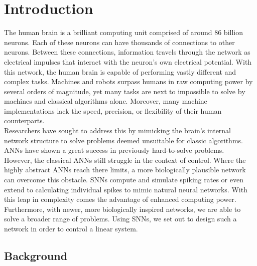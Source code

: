 \chapter{Introduction}

The human brain is a brilliant computing unit comprised of around 86 billion neurons\cite{azevedo_equal_2009}. Each of these neurons can have thousands of connections to other neurons. Between these connections, information travels through the network as electrical impulses that interact with the neuron's own electrical potential. With this network, the human brain is capable of performing vastly different and complex tasks. Machines and robots surpass humans in raw computing power by several orders of magnitude, yet many tasks are next to impossible to solve by machines and classical algorithms alone. Moreover, many machine implementations lack the speed, precision, or flexibility of their human counterparts.\\
Researchers have sought to address this by mimicking the brain's internal network structure to solve problems deemed unsuitable for classic algorithms.\\
\acp{ANN} have shown a great success in previously hard-to-solve problems.\\
However, the classical \acp{ANN} still struggle in the context of control.
Where the highly abstract \acp{ANN} reach there limits, a more biologically plausible network can overcome this obstacle.
\acp{SNN} compute and simulate spiking rates or even extend to calculating individual spikes to mimic natural neural networks. With this leap in complexity comes the advantage of enhanced computing power. Furthermore, with newer, more biologically inspired networks, we are able to solve a broader range of problems. Using \acp{SNN}, we set out to design such a network in order to control a linear system.\\

\section{Background}\label{sec:background}

